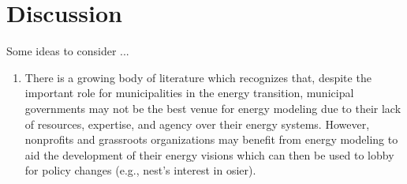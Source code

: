 



\section{Discussion}

Some ideas to consider ...

\begin{enumerate}
    \item There is a growing body of literature which recognizes that, despite
    the important role for municipalities in the energy transition, municipal
    governments may not be the best venue for energy modeling due to their lack
    of resources, expertise, and agency over their energy systems. However,
    nonprofits and grassroots organizations may benefit from energy modeling to
    aid the development of their energy visions which can then be used to lobby
    for policy changes (e.g., \ac{nest}'s interest in \ac{osier}).
\end{enumerate}


